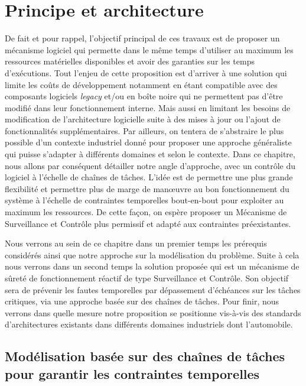 \documentclass[french, a4paper, 11pt, twoside, pdftex]{StyleThese}
\begin{document}
\setcounter{chapter}{3} %
\dominitoc
\faketableofcontents
\fi

\chapter{Principe et architecture} \label{chap:3_PrincipeArchi}
\minitoc

De fait et pour rappel, l'objectif principal de ces travaux est de proposer un mécanisme logiciel qui permette dans le même temps d'utiliser au maximum les ressources matérielles disponibles et avoir des garanties sur les temps d'exécutions. Tout l'enjeu de cette proposition est d'arriver à une solution qui limite les coûts de développement notamment en étant compatible avec des composants logiciels \textit{legacy} et/ou en boîte noire qui ne permettent pas d'être modifié dans leur fonctionnement interne. Mais aussi en limitant les besoins de modification de l'architecture logicielle suite à des mises à jour ou l'ajout de fonctionnalités supplémentaires. Par ailleurs, on tentera de s'abstraire le plus possible d'un contexte industriel donné pour proposer une approche généraliste qui puisse s'adapter à différents domaines et selon le contexte.
Dans ce chapitre, nous allons par conséquent détailler notre angle d'approche, avec un contrôle du logiciel à l'échelle de chaînes de tâches. L'idée est de permettre une plus grande flexibilité et permettre plus de marge de manœuvre au bon fonctionnement du système à l'échelle de contraintes temporelles bout-en-bout pour exploiter au maximum les ressources. De cette façon, on espère proposer un Mécanisme de Surveillance et Contrôle plus permissif et adapté aux contraintes préexistantes.

Nous verrons au sein de ce chapitre dans un premier temps les prérequis considérés ainsi que notre approche sur la modélisation du problème. Suite à cela nous verrons dans un second temps la solution proposée qui est un mécanisme de sûreté de fonctionnement réactif de type Surveillance et Contrôle. Son objectif sera de prévenir les fautes temporelles par dépassement d'échéances sur les tâches critiques, via une approche basée sur des chaînes de tâches.
Pour finir, nous verrons dans quelle mesure notre proposition se positionne vis-à-vis des standards d'architectures existants dans différents domaines industriels dont l'automobile.



\section[Modèle basé sur des chaînes de tâches]{Modélisation basée sur des chaînes de tâches pour \mbox{garantir} les contraintes temporelles}
\end{document}
